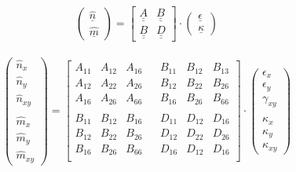 \begin{equation}
	\begin{pmatrix}
	\hat{\underline{n}}\\
	\hat{\underline{m}}
	\end{pmatrix}
= \begin{bmatrix}
	\underline{\underline{A}}&\underline{\underline{B}}\\
	\underline{\underline{B}}&\underline{\underline{D}}
\end{bmatrix}
\cdot \begin{pmatrix}
	\underline{\epsilon}\\
	\underline{\kappa}
\end{pmatrix}
\end{equation}\\

\begin{equation}
\begin{pmatrix}
		\hat{n}_{x}\\
	\hat{n}_{y}\\
	\hat{n}_{xy}\\
	\\
	\hat{m}_{x}\\
	\hat{m}_{y}\\
	\hat{m}_{xy}
\end{pmatrix}
=\begin{bmatrix}
	A_{11}&A_{12}&A_{16}&&B_{11}&B_{12}&B_{13}\\
	A_{12}&A_{22}&A_{26}&&B_{12}&B_{22}&B_{26}\\
	A_{16}&A_{26}&A_{66}&&B_{16}&B_{26}&B_{66}\\
	\\
	B_{11}&B_{12}&B_{16}&&D_{11}&D_{12}&D_{16}\\
	B_{12}&B_{22}&B_{26}&&D_{12}&D_{22}&D_{26}\\
	B_{16}&B_{26}&B_{66}&&D_{16}&D_{12}&D_{16}\\
\end{bmatrix}
\cdot \begin{pmatrix}
	\epsilon_{x}\\
	\epsilon_{y}\\
	\gamma_{xy}\\
	\\
	\kappa_{x}\\
	\kappa_{y}\\
	\kappa_{xy}
\end{pmatrix}
\end{equation}\\

